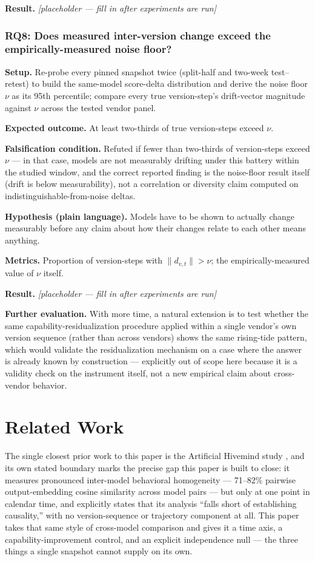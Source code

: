 \documentclass[11pt]{article}
\newcommand{\ph}{\textit{[placeholder --- fill in after experiments are run]}}
\begin{document}
\textbf{Result.} \ph

\subsubsection{RQ8: Does measured inter-version change exceed the empirically-measured noise floor?}
\textbf{Setup.} Re-probe every pinned snapshot twice (split-half and two-week test--retest) to build the same-model score-delta distribution and derive the noise floor $\nu$ as its 95th percentile; compare every true version-step's drift-vector magnitude against $\nu$ across the tested vendor panel.

\textbf{Expected outcome.} At least two-thirds of true version-steps exceed $\nu$.

\textbf{Falsification condition.} Refuted if fewer than two-thirds of version-steps exceed $\nu$ --- in that case, models are not measurably drifting under this battery within the studied window, and the correct reported finding is the noise-floor result itself (drift is below measurability), not a correlation or diversity claim computed on indistinguishable-from-noise deltas.

\textbf{Hypothesis (plain language).} Models have to be shown to actually change measurably before any claim about how their changes relate to each other means anything.

\textbf{Metrics.} Proportion of version-steps with $\|d_{v,t}\| > \nu$; the empirically-measured value of $\nu$ itself.

\textbf{Result.} \ph

\vspace{0.5em}
\noindent\textbf{Further evaluation.} With more time, a natural extension is to test whether the same capability-residualization procedure applied within a single vendor's own version sequence (rather than across vendors) shows the same rising-tide pattern, which would validate the residualization mechanism on a case where the answer is already known by construction --- explicitly out of scope here because it is a validity check on the instrument itself, not a new empirical claim about cross-vendor behavior.

\section{Related Work}

The single closest prior work to this paper is the Artificial Hivemind study \citep{ArtificialHivemind}, and its own stated boundary marks the precise gap this paper is built to close: it measures pronounced inter-model behavioral homogeneity --- 71--82\% pairwise output-embedding cosine similarity across model pairs --- but only at one point in calendar time, and explicitly states that its analysis ``falls short of establishing causality,'' with no version-sequence or trajectory component at all. This paper takes that same style of cross-model comparison and gives it a time axis, a capability-improvement control, and an explicit independence null --- the three things a single snapshot cannot supply on its own.
\end{document}

